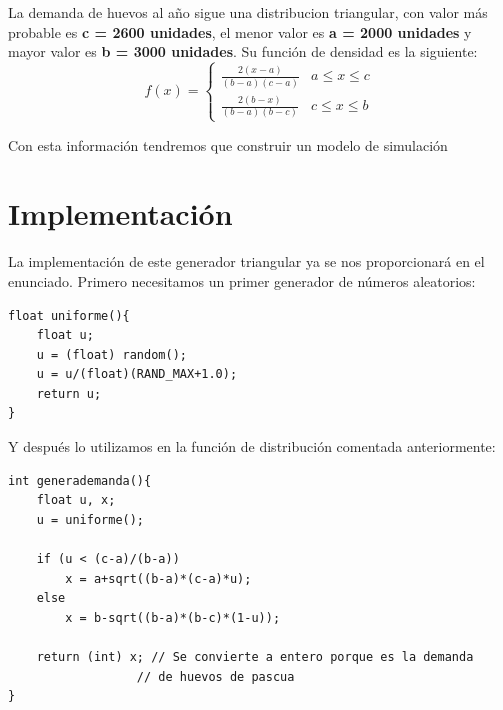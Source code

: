 \documentclass[11pt,a4paper]{article}
\begin{document}
La demanda de huevos al año sigue una distribucion triangular, con valor más probable es \textbf{c = 2600 unidades}, el menor valor es \textbf{a = 2000
unidades} y mayor valor es \textbf{b = 3000 unidades}. Su función de densidad es la siguiente:
\begin{equation*}
	f(x)=
	\left\{\begin{matrix}
	\frac{2(x-a)}{(b-a)(c-a)} & a\leq x \leq c\\ 
	\frac{2(b-x)}{(b-a)(b-c)} & c\leq x \leq b 
	\end{matrix}\right.
\end{equation*}

Con esta información tendremos que construir un modelo de simulación 



\section{Implementación}


La implementación de este generador triangular ya se nos proporcionará en el enunciado. Primero necesitamos un primer generador de números aleatorios:
\begin{lstlisting}
float uniforme(){
	float u;
	u = (float) random();
	u = u/(float)(RAND_MAX+1.0);
	return u;
}
\end{lstlisting}

Y después lo utilizamos en la función de distribución comentada anteriormente:
\begin{lstlisting}
int generademanda(){
	float u, x;
	u = uniforme();
	
	if (u < (c-a)/(b-a))
		x = a+sqrt((b-a)*(c-a)*u);
	else
		x = b-sqrt((b-a)*(b-c)*(1-u));
	
	return (int) x; // Se convierte a entero porque es la demanda
                  // de huevos de pascua
}
\end{lstlisting}
\end{document}

